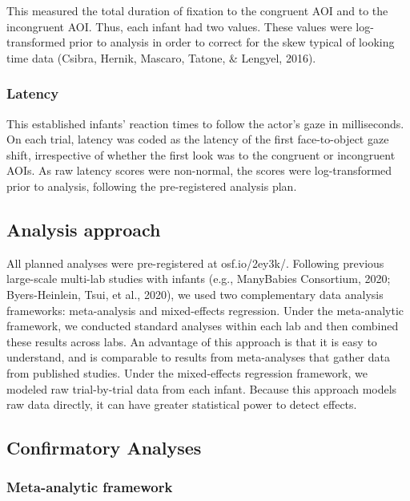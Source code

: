 \documentclass[,man,floatsintext]{apa6}
\begin{document}
This measured the total duration of fixation to the congruent AOI and to the incongruent AOI. Thus, each infant had two values. These values were log-transformed prior to analysis in order to correct for the skew typical of looking time data (Csibra, Hernik, Mascaro, Tatone, \& Lengyel, 2016).

\hypertarget{latency}{%
\subsubsection{Latency}\label{latency}}

This established infants' reaction times to follow the actor's gaze in milliseconds. On each trial, latency was coded as the latency of the first face-to-object gaze shift, irrespective of whether the first look was to the congruent or incongruent AOIs. As raw latency scores were non-normal, the scores were log-transformed prior to analysis, following the pre-registered analysis plan.

\hypertarget{analysis-approach}{%
\subsection{Analysis approach}\label{analysis-approach}}

All planned analyses were pre-registered at osf.io/2ey3k/. Following previous large-scale multi-lab studies with infants (e.g., ManyBabies Consortium, 2020; Byers-Heinlein, Tsui, et al., 2020), we used two complementary data analysis frameworks: meta-analysis and mixed-effects regression. Under the meta-analytic framework, we conducted standard analyses within each lab and then combined these results across labs. An advantage of this approach is that it is easy to understand, and is comparable to results from meta-analyses that gather data from published studies. Under the mixed-effects regression framework, we modeled raw trial-by-trial data from each infant. Because this approach models raw data directly, it can have greater statistical power to detect effects.

\hypertarget{confirmatory-analyses}{%
\subsection{Confirmatory Analyses}\label{confirmatory-analyses}}

\hypertarget{meta-analytic-framework}{%
\subsubsection{Meta-analytic framework}\label{meta-analytic-framework}}
\end{document}
